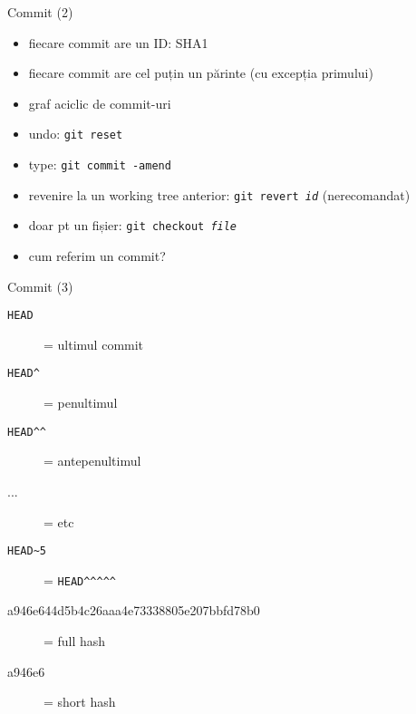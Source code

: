 \documentclass{beamer}
\begin{document}
\begin{frame}{Commit (2)}
  \begin{itemize}
    \item fiecare commit are un ID: SHA1
    \item fiecare commit are cel puțin un părinte (cu excepția primului)
    \item graf aciclic de commit-uri
    \pause
    \item undo: \texttt{git reset}
    \item type: \texttt{git commit -amend}
    \item revenire la un working tree anterior: \texttt{git revert \textit{id}}
    (nerecomandat)
    \item doar pt un fișier: \texttt{git checkout \textit{file}}
    \pause
    \item cum referim un commit?
  \end{itemize}
\end{frame}

\begin{frame}{Commit (3)}
  \begin{description}
    \item[\texttt{HEAD}] = ultimul commit
    \item[\texttt{HEAD\textasciicircum}] = penultimul
    \item[\texttt{HEAD\textasciicircum\textasciicircum}] = antepenultimul
    \item[...] = etc
    \pause
    \item[\texttt{HEAD\textasciitilde5}] = \texttt{HEAD\textasciicircum\textasciicircum\textasciicircum\textasciicircum\textasciicircum}
    \pause
    \item[a946e644d5b4c26aaa4e73338805e207bbfd78b0] = full hash
    \pause
    \item[a946e6] = short hash
  \end{description}
\end{frame}
\end{document}
